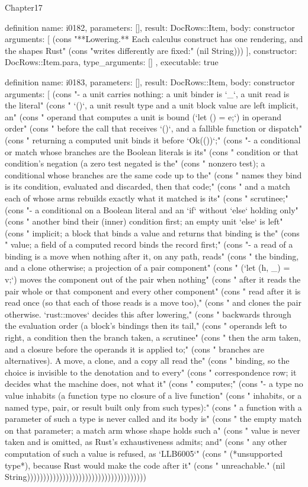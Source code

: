 \begin{lexlean}{Chapter17}
\begin{semanticmodule}
definition{
  name: i0182,
  parameters: [],
  result: DocRows::Item,
  body: constructor{
    arguments: [
      (cons "**Lowering.** Each calculus construct has one rendering, and the shapes Rust" (cons "writes differently are fixed:" (nil String)))
    ],
    constructor: DocRows::Item.para,
    type_arguments: []
  },
  executable: true
}

definition{
  name: i0183,
  parameters: [],
  result: DocRows::Item,
  body: constructor{
    arguments: [
      (cons "- a unit carries nothing: a unit binder is `_`, a unit read is the literal" (cons "  `()`, a unit result type and a unit block value are left implicit, an" (cons "  operand that computes a unit is bound (`let () = e;`) in operand order" (cons "  before the call that receives `()`, and a fallible function or dispatch" (cons "  returning a computed unit binds it before `Ok(())`;" (cons "- a conditional or match whose branches are the Boolean literals is its" (cons "  condition or that condition's negation (a zero test negated is the" (cons "  nonzero test); a conditional whose branches are the same code up to the" (cons "  names they bind is its condition, evaluated and discarded, then that code;" (cons "  and a match each of whose arms rebuilds exactly what it matched is its" (cons "  scrutinee;" (cons "- a conditional on a Boolean literal and an `if` without `else` holding only" (cons "  another bind their (inner) condition first; an empty unit `else` is left" (cons "  implicit; a block that binds a value and returns that binding is the" (cons "  value; a field of a computed record binds the record first;" (cons "- a read of a binding is a move when nothing after it, on any path, reads" (cons "  the binding, and a clone otherwise; a projection of a pair component" (cons "  (`let (h, _) = v;`) moves the component out of the pair when nothing" (cons "  after it reads the pair whole or that component and every other component" (cons "  read after it is read once (so that each of those reads is a move too)," (cons "  and clones the pair otherwise. `rust::moves` decides this after lowering," (cons "  backwards through the evaluation order (a block's bindings then its tail," (cons "  operands left to right, a condition then the branch taken, a scrutinee" (cons "  then the arm taken, and a closure before the operands it is applied to;" (cons "  branches are alternatives). A move, a clone, and a copy all read the" (cons "  binding, so the choice is invisible to the denotation and to every" (cons "  correspondence row; it decides what the machine does, not what it" (cons "  computes;" (cons "- a type no value inhabits (a function type no closure of a live function" (cons "  inhabits, or a named type, pair, or result built only from such types):" (cons "  a function with a parameter of such a type is never called and its body is" (cons "  the empty match on that parameter; a match arm whose shape holds such a" (cons "  value is never taken and is omitted, as Rust's exhaustiveness admits; and" (cons "  any other computation of such a value is refused, as `LLB6005`" (cons "  (*unsupported type*), because Rust would make the code after it" (cons "  unreachable." (nil String)))))))))))))))))))))))))))))))))))))
}}
\end{semanticmodule}
\end{lexlean}
